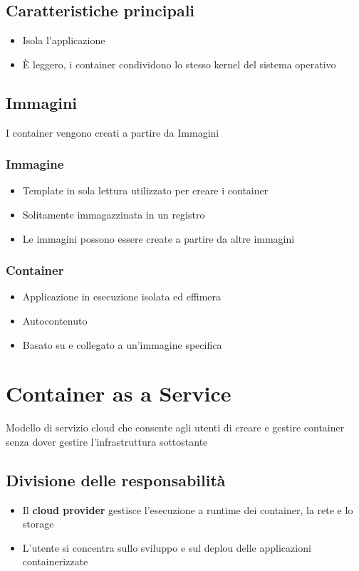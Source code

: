 \subsection{Caratteristiche principali}
\begin{itemize}
    \item Isola l'applicazione
    \item È leggero, i container condividono lo stesso kernel del sistema operativo
\end{itemize}

\subsection{Immagini}
I container vengono creati a partire da Immagini

\subsubsection{Immagine}
\begin{itemize}
    \item Template in sola lettura utilizzato per creare i container
    \item Solitamente immagazzinata in un registro
    \item Le immagini possono essere create a partire da altre immagini
\end{itemize}

\subsubsection{Container}
\begin{itemize}
    \item Applicazione in esecuzione isolata ed effimera
    \item Autocontenuto
    \item Basato su e collegato a un'immagine specifica
\end{itemize}

\section{Container as a Service}
Modello di servizio cloud che consente agli utenti di creare e gestire container senza dover gestire l'infrastruttura sottostante

\subsection{Divisione delle responsabilità}
\begin{itemize}
    \item Il \textbf{cloud provider} gestisce l'esecuzione a runtime dei container, la rete e lo storage
    \item L'utente si concentra sullo sviluppo e sul deplou delle applicazioni containerizzate
\end{itemize}


